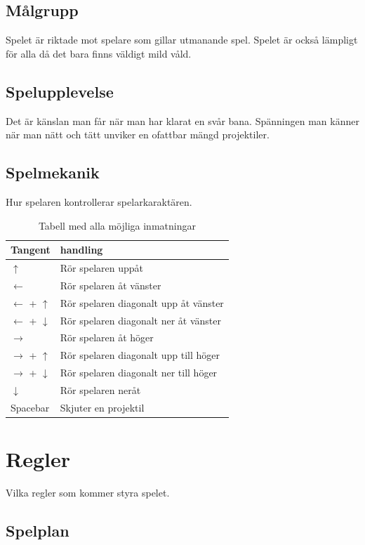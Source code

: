 \documentclass{TDP005mall}
\begin{document}
\subsection{Målgrupp}
Spelet är riktade mot spelare som gillar utmanande spel.
Spelet är också lämpligt för alla då det bara finns väldigt mild våld.
\subsection{Spelupplevelse}
Det är känslan man får när man har klarat en svår bana.
Spänningen man känner när man nätt och tätt unviker en ofattbar mängd projektiler.

\subsection{Spelmekanik}
Hur spelaren kontrollerar spelarkaraktären.
\begin{table}[H]
\caption{Tabell med alla möjliga inmatningar}
\begin{tabularx}{\linewidth}{|l|X|}
\hline
  Tangent & handling \\\hline
  $\uparrow$ & Rör spelaren uppåt \\\hline
  $\leftarrow$ & Rör spelaren åt vänster \\\hline
  $\leftarrow$ + $\uparrow$ & Rör spelaren diagonalt upp åt vänster \\\hline
  $\leftarrow$ + $\downarrow$ & Rör spelaren diagonalt ner åt vänster \\\hline
  $\rightarrow$ & Rör spelaren åt höger \\\hline
  $\rightarrow$ + $\uparrow$ & Rör spelaren diagonalt upp till höger \\\hline
  $\rightarrow$ + $\downarrow$ & Rör spelaren diagonalt ner till höger \\\hline
  $\downarrow$ & Rör spelaren neråt \\\hline
  Spacebar & Skjuter en projektil \\\hline  
\end{tabularx}
\end{table}
\clearpage
\section{Regler}
Vilka regler som kommer styra spelet.
\subsection{Spelplan}
\end{document}
